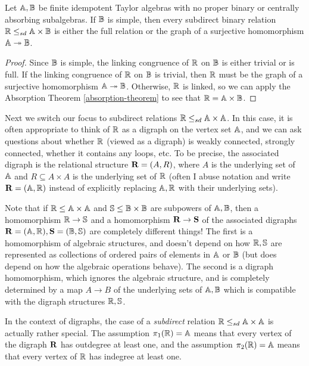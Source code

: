\documentclass[letterpaper,11pt]{article}
\begin{document}
\begin{cor}\label{absorption-free-binary} Let $\mathbb{A}, \mathbb{B}$ be finite idempotent Taylor algebras with no proper binary or centrally absorbing subalgebras. If $\mathbb{B}$ is simple, then every subdirect binary relation $\mathbb{R} \le_{sd} \mathbb{A}\times \mathbb{B}$ is either the full relation or the graph of a surjective homomorphism $\mathbb{A} \twoheadrightarrow \mathbb{B}$.
\end{cor}
\begin{proof} Since $\mathbb{B}$ is simple, the linking congruence of $\mathbb{R}$ on $\mathbb{B}$ is either trivial or is full. If the linking congruence of $\mathbb{R}$ on $\mathbb{B}$ is trivial, then $\mathbb{R}$ must be the graph of a surjective homomorphism $\mathbb{A} \twoheadrightarrow \mathbb{B}$. Otherwise, $\mathbb{R}$ is linked, so we can apply the Absorption Theorem \ref{absorption-theorem} to see that $\mathbb{R} = \mathbb{A} \times \mathbb{B}$.
\end{proof}

Next we switch our focus to subdirect relations $\mathbb{R} \le_{sd} \mathbb{A}\times\mathbb{A}$. In this case, it is often appropriate to think of $\mathbb{R}$ as a digraph on the vertex set $\mathbb{A}$, and we can ask questions about whether $\mathbb{R}$ (viewed as a digraph) is weakly connected, strongly connected, whether it contains any loops, etc. To be precise, the associated digraph is the relational structure $\mathbf{R} = (A,R)$, where $A$ is the underlying set of $\mathbb{A}$ and $R \subseteq A\times A$ is the underlying set of $\mathbb{R}$ (often I abuse notation and write $\mathbf{R} = (\mathbb{A},\mathbb{R})$ instead of explicitly replacing $\mathbb{A},\mathbb{R}$ with their underlying sets).

\begin{rem} Note that if $\mathbb{R} \le \mathbb{A}\times \mathbb{A}$ and $\mathbb{S} \le \mathbb{B}\times \mathbb{B}$ are subpowers of $\mathbb{A}, \mathbb{B}$, then a homomorphism $\mathbb{R} \rightarrow \mathbb{S}$ and a homomorphism $\mathbf{R} \rightarrow \mathbf{S}$ of the associated digraphs $\mathbf{R} = (\mathbb{A},\mathbb{R}), \mathbf{S} = (\mathbb{B},\mathbb{S})$ are completely different things! The first is a homomorphism of algebraic structures, and doesn't depend on how $\mathbb{R},\mathbb{S}$ are represented as collections of ordered pairs of elements in $\mathbb{A}$ or $\mathbb{B}$ (but does depend on how the algebraic operations behave). The second is a digraph homomorphism, which ignores the algebraic structure, and is completely determined by a map $A \rightarrow B$ of the underlying sets of $\mathbb{A},\mathbb{B}$ which is compatible with the digraph structures $\mathbb{R},\mathbb{S}$.
\end{rem}

In the context of digraphs, the case of a \emph{subdirect} relation $\mathbb{R} \le_{sd} \mathbb{A} \times \mathbb{A}$ is actually rather special. The assumption $\pi_1(\mathbb{R}) = \mathbb{A}$ means that every vertex of the digraph $\mathbf{R}$ has outdegree at least one, and the assumption $\pi_2(\mathbb{R}) = \mathbb{A}$ means that every vertex of $\mathbb{R}$ has indegree at least one.
\end{document}
